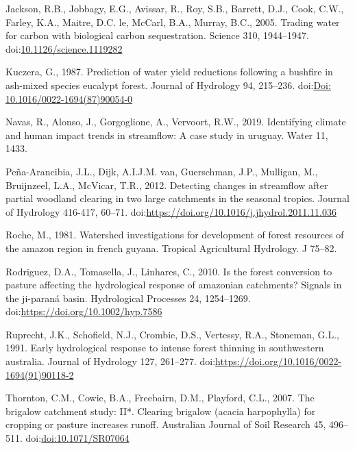 \documentclass[]{elsarticle} %
\newlength{\cslhangindent}
\newlength{\cslentryspacingunit} %
\newenvironment{CSLReferences}[2] %
 {%
  \setlength{\parindent}{0pt}
  \ifodd #1
  \let\oldpar\par
  \def\par{\hangindent=\cslhangindent\oldpar}
  \fi
  \setlength{\parskip}{#2\cslentryspacingunit}
 }%
 {}
\begin{document}
\begin{CSLReferences}{1}{0}
\leavevmode{}%
Jackson, R.B., Jobbagy, E.G., Avissar, R., Roy, S.B., Barrett, D.J., Cook, C.W., Farley, K.A., Maitre, D.C. le, McCarl, B.A., Murray, B.C., 2005. Trading water for carbon with biological carbon sequestration. Science 310, 1944--1947. doi:\href{https://doi.org/10.1126/science.1119282}{10.1126/science.1119282}

\leavevmode{}%
Kuczera, G., 1987. Prediction of water yield reductions following a bushfire in ash-mixed species eucalypt forest. Journal of Hydrology 94, 215--236. doi:\href{https://doi.org/Doi:\%2010.1016/0022-1694(87)90054-0}{Doi: 10.1016/0022-1694(87)90054-0}

\leavevmode{}%
Navas, R., Alonso, J., Gorgoglione, A., Vervoort, R.W., 2019. Identifying climate and human impact trends in streamflow: A case study in uruguay. Water 11, 1433.

\leavevmode{}%
Peña-Arancibia, J.L., Dijk, A.I.J.M. van, Guerschman, J.P., Mulligan, M., Bruijnzeel, L.A., McVicar, T.R., 2012. Detecting changes in streamflow after partial woodland clearing in two large catchments in the seasonal tropics. Journal of Hydrology 416-417, 60--71. doi:\url{https://doi.org/10.1016/j.jhydrol.2011.11.036}

\leavevmode{}%
Roche, M., 1981. Watershed investigations for development of forest resources of the amazon region in french guyana. Tropical Agricultural Hydrology. J 75--82.

\leavevmode{}%
Rodriguez, D.A., Tomasella, J., Linhares, C., 2010. Is the forest conversion to pasture affecting the hydrological response of amazonian catchments? Signals in the ji-paraná basin. Hydrological Processes 24, 1254--1269. doi:\url{https://doi.org/10.1002/hyp.7586}

\leavevmode{}%
Ruprecht, J.K., Schofield, N.J., Crombie, D.S., Vertessy, R.A., Stoneman, G.L., 1991. Early hydrological response to intense forest thinning in southwestern australia. Journal of Hydrology 127, 261--277. doi:\url{https://doi.org/10.1016/0022-1694(91)90118-2}

\leavevmode{}%
Thornton, C.M., Cowie, B.A., Freebairn, D.M., Playford, C.L., 2007. The brigalow catchment study: II*. Clearing brigalow (acacia harpophylla) for cropping or pasture increases runoff. Australian Journal of Soil Research 45, 496--511. doi:\href{https://doi.org/doi:10.1071/SR07064}{doi:10.1071/SR07064}


\end{CSLReferences}
\end{document}
